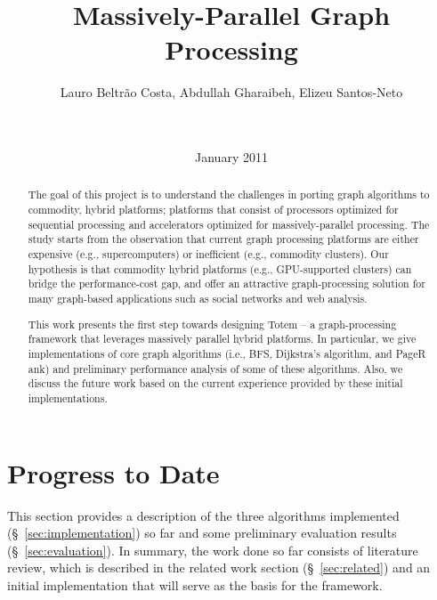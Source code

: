 \documentclass{acm_proc_article-sp}[12pt]
\title{Massively-Parallel Graph Processing}
\author{
\alignauthor 
Lauro Beltr\~ao Costa, Abdullah Gharaibeh, Elizeu
Santos-Neto\vspace{3mm}\\
       \affaddr{\small{University of British Columbia}}\\
       \affaddr{\small{2332 Main Mall, Vancouver, BC, CANADA}}\\
       \email{\small{\{lauroc,abdullah,elizeus\}@ece.ubc.ca}}
}
\date{ January 2011}
\newcommand{\comment}[2]{\begin{center}\colorbox{#1}{\parbox{0.85\linewidth}{\textit{{#2}}}}\end{center}}
\newcommand{\abdullah}[1]{\comment{midblue}{{Abdullah: #1}}}
\newcommand{\lauro}[1]{\comment{orange}{{Lauro: #1}}}
\newcommand{\elizeu}[1]{\comment{lightgreen}{{Elizeu: #1}}}
\begin{document}
\maketitle


\begin{abstract}
The goal of this project is to understand the challenges in porting graph algorithms to commodity, hybrid platforms; platforms that consist of processors optimized for sequential processing and accelerators optimized for massively-parallel processing. The study starts from the observation that current graph processing platforms are either expensive (e.g., supercomputers) or inefficient (e.g., commodity clusters). Our hypothesis is that commodity hybrid platforms (e.g., GPU-supported clusters) can bridge the performance-cost gap, and offer an attractive graph-processing solution for many graph-based applications such as social networks and web analysis.

This work presents the first step towards designing {\sc Totem} -- a graph-processing framework that leverages massively parallel hybrid platforms. In particular, we give implementations of core graph algorithms (i.e., BFS, Dijkstra's algorithm, and PageR ank) and preliminary performance analysis of some of these algorithms. Also, we discuss the future work based on the current experience provided by these initial implementations.


\end{abstract}







\section{Progress to Date}
\label{sec:progress}

This section provides a description of the three algorithms implemented (\S~\ref{sec:implementation}) so far and some preliminary evaluation results (\S~\ref{sec:evaluation}). In summary, the work done so far consists of literature review, which is described in the related work section (\S~\ref{sec:related}) and an initial implementation that will serve as the basis for the framework.


%






\end{document}
